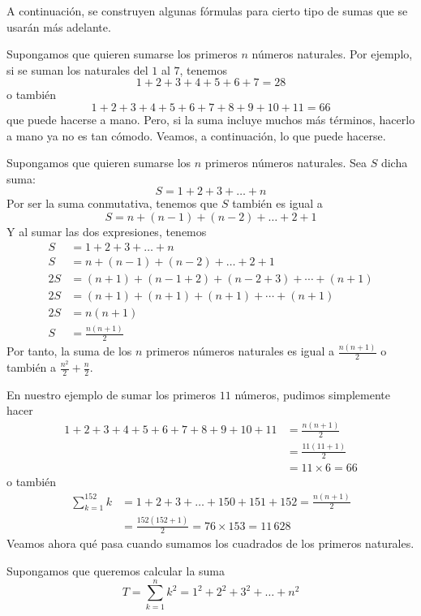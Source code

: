 A continuación, se construyen algunas fórmulas para cierto tipo de sumas que se usarán más adelante.

\begin{ejemplo}
  Supongamos que quieren sumarse los primeros $n$ números naturales. Por ejemplo, si se suman los naturales del $1$ al $7$, tenemos
  \[1+2+3+4+5+6+7=28\]
  o también
  \[1+2+3+4+5+6+7+8+9+10+11=66\]
  que puede hacerse a mano. Pero, si la suma incluye muchos más términos, hacerlo a mano ya no es tan cómodo. Veamos, a continuación, lo que puede hacerse.
\end{ejemplo}

Supongamos que quieren sumarse los $n$ primeros números naturales. Sea $S$ dicha suma:
\[
  S=1+2+3+\ldots +n
\]
Por ser la suma conmutativa, tenemos que $S$ también es igual a
\[
  S=n+\left( n-1\right) +\left( n-2\right) +\ldots +2+1
\]
Y al sumar las dos expresiones, tenemos
\begin{align*}
  S&=1+2+3+\ldots +n \\
  S&=n+\left( n-1\right) +\left( n-2\right) +\ldots +2+1\\
  2S&=\left( n+1\right) +\left( n-1+2\right) +\left( n-2+3\right) +\cdots +\left(n+1\right)\\
  2S&=\left( n+1\right) +\left( n+1\right) +\left( n+1\right) +\cdots +\left(
  n+1\right)\\
  2S&=n\left( n+1\right)\\
  S&=\frac{n\left( n+1\right) }{2}
\end{align*}
Por tanto, la suma de los $n$ primeros números naturales es igual a $\frac{n\left( n+1\right) }{2}$ o también a $\frac{n^2}{2}+\frac{n}{2}$.

En nuestro ejemplo de sumar los primeros $11$ números, pudimos simplemente hacer
\begin{align*}
  1+2+3+4+5+6+7+8+9+10+11&=\frac{n\left( n+1\right) }{2}\\
  &=\frac{11\left(11+1\right) }{2}\\
  &=11\times 6=66
\end{align*}
o también
\begin{align*}
  \sum_{k=1}^{152} k&=1+2+3+\ldots+150+151+152=\frac{n\left( n+1\right) }{2}\\
  &=\frac{152\left(152+1\right)}{2}=76\times 153=11\,628
\end{align*}
Veamos ahora qué pasa cuando sumamos los cuadrados de los primeros naturales.

\begin{ejemplo}
  Supongamos que queremos calcular la suma
  \[
    T=\sum_{k=1}^{n}k^{2}=1^{2}+2^{2}+3^{2}+\ldots +n^{2}
  \]
\end{ejemplo}

